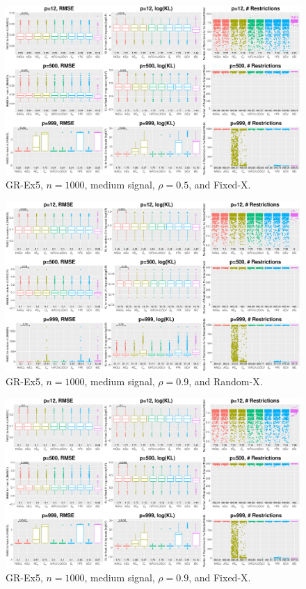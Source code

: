 \begin{figure}[!ht]
\centering
\includegraphics[width=\textwidth]{figures/supplement/fixedx_GR-Ex5_n1000_msnr_rho05.eps}
\caption{GR-Ex5, $n=1000$, medium signal, $\rho=0.5$, and Fixed-X.}
\end{figure}
\clearpage
\begin{figure}[!ht]
\centering
\includegraphics[width=\textwidth]{figures/supplement/randomx_GR-Ex5_n1000_msnr_rho09.eps}
\caption{GR-Ex5, $n=1000$, medium signal, $\rho=0.9$, and Random-X.}
\end{figure}
\begin{figure}[!ht]
\centering
\includegraphics[width=\textwidth]{figures/supplement/fixedx_GR-Ex5_n1000_msnr_rho09.eps}
\caption{GR-Ex5, $n=1000$, medium signal, $\rho=0.9$, and Fixed-X.}
\end{figure}
